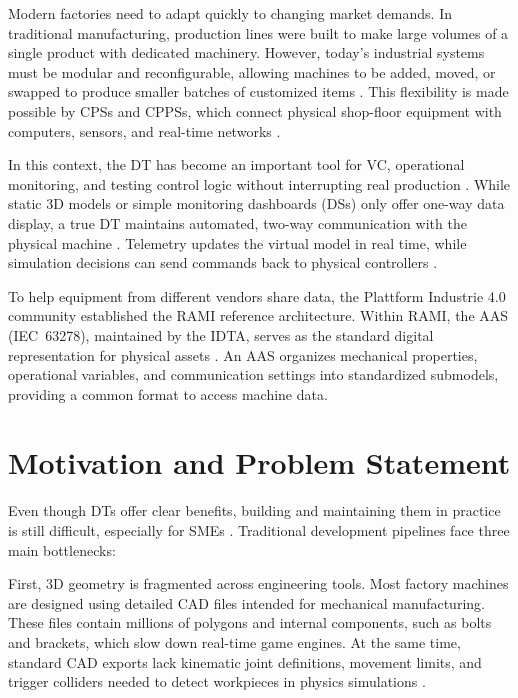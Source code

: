 Modern factories need to adapt quickly to changing market demands. In traditional manufacturing, production lines were built to make large volumes of a single product with dedicated machinery. However, today's industrial systems must be modular and reconfigurable, allowing machines to be added, moved, or swapped to produce smaller batches of customized items \cite{Khan2025}. This flexibility is made possible by \glspl{CPS} and \glspl{CPPS}, which connect physical shop-floor equipment with computers, sensors, and real-time networks \cite{Abdel-Aty2022,Rocha2024}.

In this context, the \gls{DT} has become an important tool for \gls{VC}, operational monitoring, and testing control logic without interrupting real production \cite{Tao2019}. While static 3D models or simple monitoring dashboards (\glspl{DS}) only offer one-way data display, a true \gls{DT} maintains automated, two-way communication with the physical machine \cite{Kritzinger2018}. Telemetry updates the virtual model in real time, while simulation decisions can send commands back to physical controllers \cite{Pajpach2023}.

To help equipment from different vendors share data, the Plattform Industrie 4.0 community established the \gls{RAMI} reference architecture. Within \gls{RAMI}, the \gls{AAS} (\gls{IEC}~63278), maintained by the \gls{IDTA}, serves as the standard digital representation for physical assets \cite{Lu2025}. An \gls{AAS} organizes mechanical properties, operational variables, and communication settings into standardized submodels, providing a common format to access machine data.

\section{Motivation and Problem Statement}
\label{sec:motivation}

Even though \glspl{DT} offer clear benefits, building and maintaining them in practice is still difficult, especially for \glspl{SME} \cite{Schaper2025}. Traditional development pipelines face three main bottlenecks:

First, 3D geometry is fragmented across engineering tools. Most factory machines are designed using detailed \gls{CAD} files intended for mechanical manufacturing. These files contain millions of polygons and internal components, such as bolts and brackets, which slow down real-time game engines. At the same time, standard \gls{CAD} exports lack kinematic joint definitions, movement limits, and trigger colliders needed to detect workpieces in physics simulations \cite{Chowdhury2025}.

